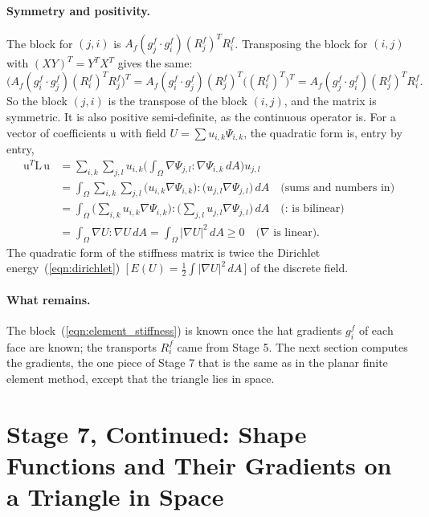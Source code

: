 \paragraph{Symmetry and positivity.} The block for $(j, i)$ is $A_f (g_j^f \cdot g_i^f) (R_j^f)^T R_i^f$. Transposing the block for $(i, j)$ with $(XY)^T = Y^TX^T$ gives the same:
\begin{equation*}
\big(A_f (g_i^f \cdot g_j^f) (R_i^f)^T R_j^f\big)^T = A_f (g_i^f \cdot g_j^f) (R_j^f)^T \big((R_i^f)^T\big)^T = A_f (g_j^f \cdot g_i^f) (R_j^f)^T R_i^f .
\end{equation*}
So the block $(j, i)$ is the transpose of the block $(i, j)$, and the matrix is symmetric. It is also positive semi-definite, as the continuous operator is. For a vector of coefficients $\mathrm u$ with field $U = \sum u_{i,k}\Psi_{i,k}$, the quadratic form is, entry by entry,
\begin{align*}
\mathrm u^T \mathrm L\, \mathrm u &= \sum_{i,k}\sum_{j,l} u_{i,k}\Big(\int_\Omega \nabla\Psi_{j,l} : \nabla\Psi_{i,k}\, dA\Big) u_{j,l} \\
&= \int_\Omega \sum_{i,k}\sum_{j,l} \big(u_{i,k}\nabla\Psi_{i,k}\big) : \big(u_{j,l}\nabla\Psi_{j,l}\big)\, dA \quad \text{(sums and numbers in)}\\
&= \int_\Omega \Big(\sum_{i,k} u_{i,k}\nabla\Psi_{i,k}\Big) : \Big(\sum_{j,l} u_{j,l}\nabla\Psi_{j,l}\Big)\, dA \quad \text{($:$ is bilinear)}\\
&= \int_\Omega \nabla U : \nabla U\, dA = \int_\Omega |\nabla U|^2\, dA \geq 0 \quad \text{($\nabla$ is linear)} .
\end{align*}
The quadratic form of the stiffness matrix is twice the Dirichlet energy~(\ref{eqn:dirichlet})~[\,$E(U) = \frac12\int|\nabla U|^2\,dA$\,] of the discrete field.

\paragraph{What remains.} The block~(\ref{eqn:element_stiffness}) is known once the hat gradients $g_i^f$ of each face are known; the transports $R_i^f$ came from Stage 5. The next section computes the gradients, the one piece of Stage 7 that is the same as in the planar finite element method, except that the triangle lies in space.

\section{Stage 7, Continued: Shape Functions and Their Gradients on a Triangle in Space}
\label{section:gradients}

